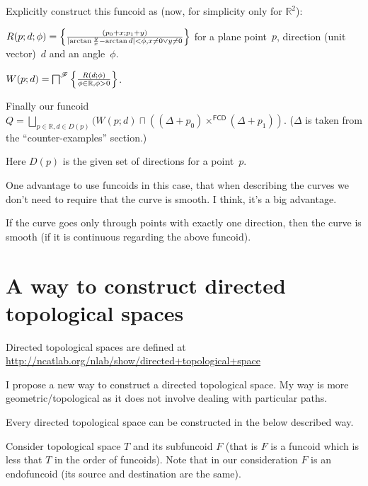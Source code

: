 Explicitly construct this funcoid as (now, for simplicity only for $\mathbb{R}^2$):

$R(p;d;\phi) = \left\{ \frac{(p_0+x;p_1+y)}{\lvert\arctan\frac{y}{x}-\arctan{d}\rvert<\phi, x\ne 0\lor y\ne 0}\right\}$  for a plane point~$p$, direction (unit vector)~$d$ and an angle~$\phi$.

$W(p;d) = \bigsqcap^{\mathscr{F}}\left\{ \frac{R(d;\phi)}{\phi\in\mathbb{R},\phi>0}\right\}$.

Finally our funcoid $Q=\bigsqcup_{p\in\mathbb{R}, d\in D(p)} (W(p;d) \sqcap ((\Delta+p_0) \times^{\mathsf{FCD}} (\Delta+p_1))$. ($\Delta$ is taken from the ``counter-examples'' section.)

Here $D(p)$ is the given set of directions for a point~$p$.

One advantage to use funcoids in this case, that when describing the curves we don't need to require that the curve is smooth. I think, it's a big advantage.


\begin{conjecture}
If the curve goes only through points with exactly one direction, then the curve is smooth (if it is continuous regarding the above funcoid).
\end{conjecture}

\section{A way to construct directed topological spaces}


Directed topological spaces are defined at\\
\url{http://ncatlab.org/nlab/show/directed+topological+space}

I propose a new way to construct a directed topological space. My way is more geometric/topological as it does not involve dealing with particular paths.

\begin{conjecture}
Every directed topological space can be constructed in the below described way.
\end{conjecture}

Consider topological space $T$ and its subfuncoid $F$ (that is $F$ is a funcoid which is less that $T$ in the order of funcoids).
Note that in our consideration $F$ is an endofuncoid (its source and destination are the same).


